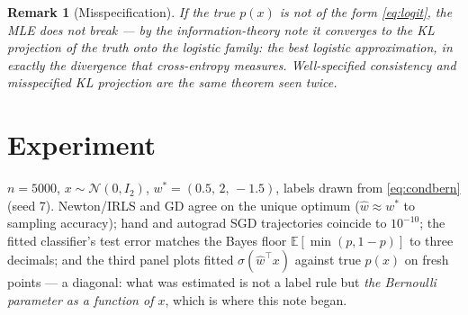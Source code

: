 \documentclass[11pt]{article}
\newtheorem{remark}{Remark}
\newcommand{\sig}{\sigma}
\begin{document}
\begin{remark}[Misspecification]
If the true $p(x)$ is \emph{not} of the form \eqref{eq:logit}, the MLE
does not break --- by the information-theory note it converges to the KL
projection of the truth onto the logistic family: the best logistic
approximation, in exactly the divergence that cross-entropy measures.
Well-specified consistency and misspecified KL projection are the same
theorem seen twice.
\end{remark}

\section{Experiment}

$n = 5000$, $x \sim \mathcal{N}(0, I_2)$, $w^\ast = (0.5,\, 2,\, -1.5)$,
labels drawn from \eqref{eq:condbern} (seed 7). Newton/IRLS and GD agree
on the unique optimum ($\hat w \approx w^\ast$ to sampling accuracy);
hand and autograd SGD trajectories coincide to $10^{-10}$; the fitted
classifier's test error matches the Bayes floor
$\mathbb{E}[\min(p, 1-p)]$ to three decimals; and the third panel plots
fitted $\sig(\hat w^\top x)$ against true $p(x)$ on fresh points ---
a diagonal: what was estimated is not a label rule but \emph{the Bernoulli
parameter as a function of $x$}, which is where this note began.
\end{document}
